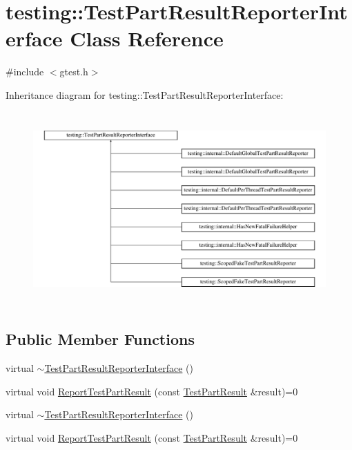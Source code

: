 \hypertarget{classtesting_1_1_test_part_result_reporter_interface}{\section{testing\-:\-:Test\-Part\-Result\-Reporter\-Interface Class Reference}
\label{classtesting_1_1_test_part_result_reporter_interface}
}


{\ttfamily \#include $<$gtest.\-h$>$}

Inheritance diagram for testing\-:\-:Test\-Part\-Result\-Reporter\-Interface\-:\begin{figure}[H]
\begin{center}
\leavevmode
\includegraphics[height=7.433628cm]{classtesting_1_1_test_part_result_reporter_interface}
\end{center}
\end{figure}
\subsection*{Public Member Functions}
\begin{DoxyCompactItemize}
\item 
virtual \hyperlink{classtesting_1_1_test_part_result_reporter_interface_a338b51591ed654f84dc0feaaf2b66917}{$\sim$\-Test\-Part\-Result\-Reporter\-Interface} ()
\item 
virtual void \hyperlink{classtesting_1_1_test_part_result_reporter_interface_aa2f920e7a5a0a6d0faf19e3727928c22}{Report\-Test\-Part\-Result} (const \hyperlink{classtesting_1_1_test_part_result}{Test\-Part\-Result} \&result)=0
\item 
virtual \hyperlink{classtesting_1_1_test_part_result_reporter_interface_a338b51591ed654f84dc0feaaf2b66917}{$\sim$\-Test\-Part\-Result\-Reporter\-Interface} ()
\item 
virtual void \hyperlink{classtesting_1_1_test_part_result_reporter_interface_aa2f920e7a5a0a6d0faf19e3727928c22}{Report\-Test\-Part\-Result} (const \hyperlink{classtesting_1_1_test_part_result}{Test\-Part\-Result} \&result)=0
\end{DoxyCompactItemize}


